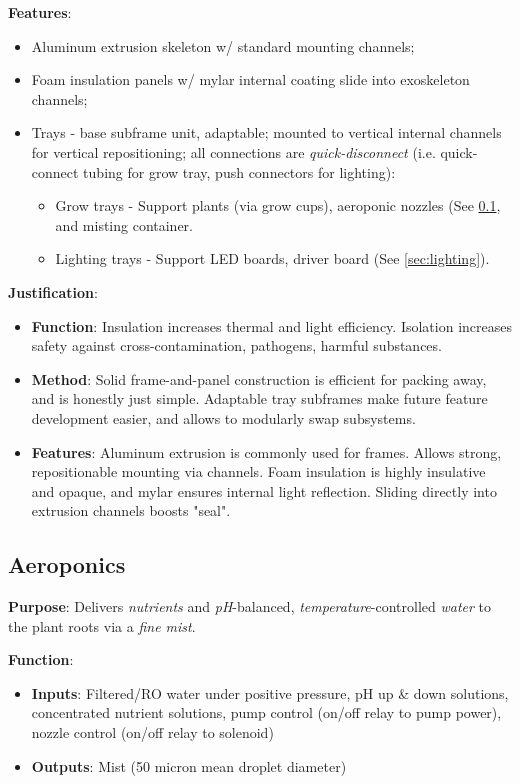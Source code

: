 \documentclass{report}
\begin{document}
\textbf{Features}:
\begin{itemize}
    \item Aluminum extrusion skeleton w/ standard mounting channels;
    \item Foam insulation panels w/ mylar internal coating slide into exoskeleton channels;
    \item Trays - base subframe unit, adaptable; mounted to vertical internal channels for vertical repositioning; all connections are \textit{quick-disconnect} (i.e. quick-connect tubing for grow tray, push connectors for lighting):
    \begin{itemize}
        \item Grow trays - Support plants (via grow cups), aeroponic nozzles (See \ref{sec:aeroponics}, and misting container.
        \item Lighting trays - Support LED boards, driver board (See \ref{sec:lighting}).
    \end{itemize}
\end{itemize}

\textbf{Justification}: 
\begin{itemize}
    \item \textbf{Function}: Insulation increases thermal and light efficiency. Isolation increases safety against cross-contamination, pathogens, harmful substances.
    \item \textbf{Method}: Solid frame-and-panel construction is efficient for packing away, and is honestly just simple. Adaptable tray subframes make future feature development easier, and allows to modularly swap subsystems.
    \item \textbf{Features}: Aluminum extrusion is commonly used for frames. Allows strong, repositionable mounting via channels. Foam insulation is highly insulative and opaque, and mylar ensures internal light reflection. Sliding directly into extrusion channels boosts "seal".
\end{itemize}

\newpage

\subsection{Aeroponics}
\label{sec:aeroponics}

\textbf{Purpose}: Delivers \textit{nutrients} and \textit{pH}-balanced, \textit{temperature}-controlled \textit{water} to the plant roots via a \textit{fine mist}.

\textbf{Function}:
\begin{itemize}
    \item \textbf{Inputs}: Filtered/RO water under positive pressure, pH up \& down solutions, concentrated nutrient solutions, pump control (on/off relay to pump power), nozzle control (on/off relay to solenoid)
    \item \textbf{Outputs}: Mist (50 micron mean droplet diameter)
\end{itemize}
\end{document}

